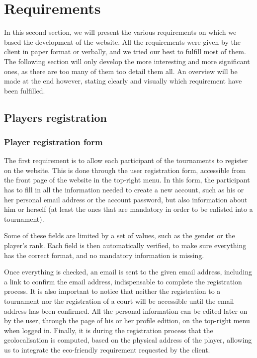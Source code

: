 \section{Requirements}
\label{sec:Requirements}


In this second section, we will present the various requirements on which we
based the development of the website. All the requirements were given by the
client in paper format or verbally, and we tried our best to fulfill most of
them. The following section will only develop the more interesting
and more significant ones, as there are too many of them too detail them all. An overview will be made at the end however, stating clearly and visually which requirement have been fulfilled.

\subsection{Players registration}
\label{sub:Players registration}

\subsubsection{Player registration form}
\label{subs:Registration form}


The first requirement is to allow each participant of the tournaments to
register on the website. This is done through the user registration form,
accessible from the front page of the website in the top-right menu.
In this form, the participant has to fill in all the information needed to
create a new account, such as his or her personal email address or the account
password, but also information about him or herself (at least the ones that
are mandatory in order to be enlisted into a tournament).\newline

Some of these fields are limited by a set of values, such as the gender or the
player's rank. Each field is then automatically verified, to make sure
everything has the correct format, and no mandatory information is missing.\newline

Once everything is checked, an email is sent to the given email address,
including a link to confirm the email address, indispensable to complete
the registration process. It is also important to notice that neither the
registration to a tournament nor the registration of a court will be accessible
until the email address has been confirmed. All the personal information can
be edited later on by the user, through the page of his or her profile edition,
on the top-right menu when logged in. Finally, it is during the registration
process that the geolocalisation is computed, based on the physical address
of the player, allowing us to integrate the eco-friendly requirement requested
by the client. \newline

